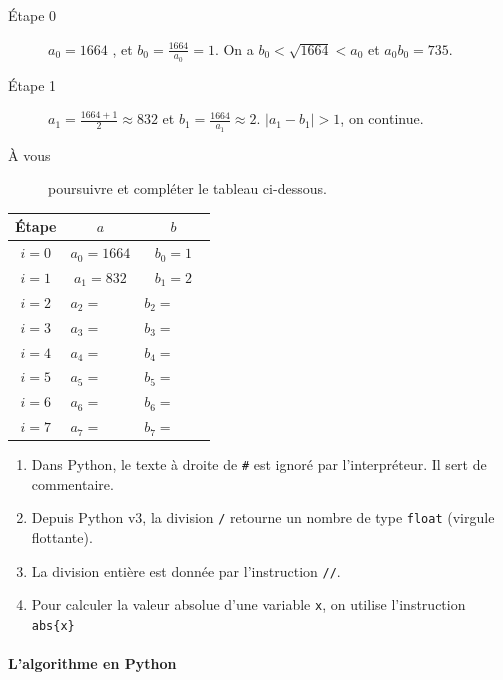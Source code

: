 \begin{description}
	\item[Étape 0] $a_0=1664$ , et $b_0=\frac{1664}{a_0}=1$. On a $b_0<\sqrt{1664}<a_0$ et $a_0 b_0=735$.
	\item[Étape 1] $a_1=\frac{1664+1}{2}\approx 832$ et $b_1=\frac{1664}{a_1}\approx 2$. $|a_1-b_1|>1$, on continue.
	\item[À vous] poursuivre et compléter le tableau ci-dessous. 
\end{description}
\begin{tabular}[]{ccc}\toprule
	Étape & $a$ & $b$ \\ \midrule 
	$i=0$\rule{0pt}{1.3em}& $a_0=1664$ & $b_0=1$ \\ \hline
	$i=1$\rule{0pt}{1.3em}& $a_1=832$ & $b_1=2$ \\ \hline
	$i=2$\rule{0pt}{1.3em}& $a_2=\qquad$ & $b_2=\qquad$ \\ \hline
	$i=3$\rule{0pt}{1.3em}& $a_3=\qquad$ & $b_3=\qquad$ \\ \hline
	$i=4$\rule{0pt}{1.3em}& $a_4=\qquad$ & $b_4=\qquad$ \\ \hline
	$i=5$\rule{0pt}{1.3em}& $a_5=\qquad$ & $b_5=\qquad$ \\ \hline
	$i=6$\rule{0pt}{1.3em}& $a_6=\qquad$ & $b_6=\qquad$ \\ \hline
	$i=7$\rule{0pt}{1.em}& $a_7=\qquad$ & $b_7=\qquad$ \\ \bottomrule  
\end{tabular}
\begin{tBox}
	\begin{enumerate}[label=\textbullet, leftmargin=*]
		\item Dans Python, le texte à droite de \lstinline|#| est ignoré par l'interpréteur. Il sert de commentaire.
		\item Depuis Python v3, la division \lstinline|/| retourne un nombre de type \lstinline|float| (virgule flottante).
		\item La division entière est donnée par l'instruction \lstinline|//|.
		\item Pour calculer la valeur absolue d'une variable \lstinline|x|, on utilise l'instruction \lstinline|abs{x}|
	\end{enumerate} 
\end{tBox}

\paragraph{L'algorithme en Python}\hfill 



